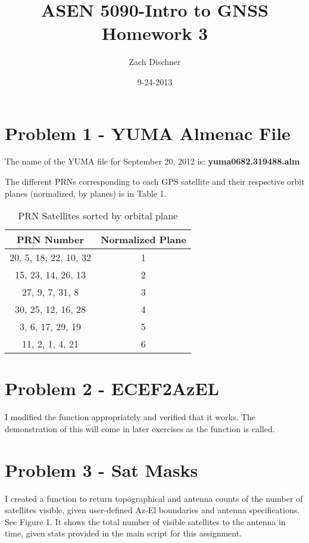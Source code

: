 \documentclass[12pt,a4paper,oneside]{article}
\begin{document}
	
	\title{ASEN 5090-Intro to GNSS Homework 3}
	\author{Zach Dischner}
	\date{9-24-2013}
	\maketitle

\section{Problem 1 - YUMA Almenac File}
The name of the YUMA file for September 20, 2012 is: \textbf{yuma0682.319488.alm}

The different PRNs corresponding to each GPS satellite and their respective orbit planes (normalized, by planes) is in Table 1. 

\begin{table}[H]
	\centering
	\begin{tabular}{|c|c|}
		\hline
		\textbf{PRN Number} &	\textbf{Normalized Plane}	 \\\hline
		    20, 5, 18, 22, 10, 32&     1\\\hline
		    15, 23, 14, 26, 13 &     2\\\hline
		    27, 9, 7, 31, 8&     3\\\hline
		    30, 25, 12, 16, 28&     4\\\hline
		     3, 6, 17, 29, 19&     5\\\hline
		    11, 2, 1, 4, 21&     6\\\hline
	\end{tabular}
	\caption{PRN Satellites sorted by orbital plane}
\end{table}



\section{Problem 2 - ECEF2AzEL}
I modified the function appropriately and verified that it works. The demonstration of this will come in later exercises as the function is called. 

\section{Problem 3 - Sat Masks} 
I created a function to return topographical  and antenna counts of the number of satellites visible, given user-defined Az-El boundaries and antenna specifications. See Figure 1. It shows the total number of visible satellites to the antenna in time, given stats provided in the main script for this assignment. 
\end{document}
